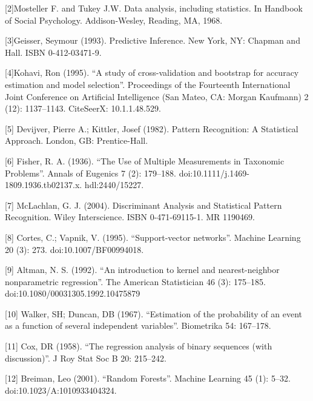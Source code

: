 \documentclass[journal]{IEEEtran}
\begin{document}
[2]Mosteller F. and Tukey J.W. Data analysis, including statistics. In Handbook of Social Psychology. Addison-Wesley, Reading, MA, 1968.

[3]Geisser, Seymour (1993). Predictive Inference. New York, NY: Chapman and Hall. ISBN 0-412-03471-9.

[4]Kohavi, Ron (1995). ``A study of cross-validation and bootstrap for accuracy estimation and model selection''. Proceedings of the Fourteenth International Joint Conference on Artificial Intelligence (San Mateo, CA: Morgan Kaufmann) 2 (12): 1137–1143. CiteSeerX: 10.1.1.48.529.

[5] Devijver, Pierre A.; Kittler, Josef (1982). Pattern Recognition: A Statistical Approach. London, GB: Prentice-Hall.

[6] Fisher, R. A. (1936). ``The Use of Multiple Measurements in Taxonomic Problems''. Annals of Eugenics 7 (2): 179–188. doi:10.1111/j.1469-1809.1936.tb02137.x. hdl:2440/15227.

[7] McLachlan, G. J. (2004). Discriminant Analysis and Statistical Pattern Recognition. Wiley Interscience. ISBN 0-471-69115-1. MR 1190469.

[8] Cortes, C.; Vapnik, V. (1995). ``Support-vector networks''. Machine Learning 20 (3): 273. doi:10.1007/BF00994018.

[9] Altman, N. S. (1992). ``An introduction to kernel and nearest-neighbor nonparametric regression''. The American Statistician 46 (3): 175–185. doi:10.1080/00031305.1992.10475879

[10]  Walker, SH; Duncan, DB (1967). ``Estimation of the probability of an event as a function of several independent variables''. Biometrika 54: 167–178.

[11] Cox, DR (1958). ``The regression analysis of binary sequences (with discussion)''. J Roy Stat Soc B 20: 215–242.

[12] Breiman, Leo (2001). ``Random Forests''. Machine Learning 45 (1): 5–32. doi:10.1023/A:1010933404324.
\end{document}
